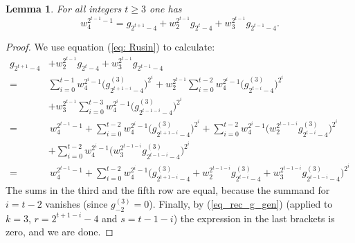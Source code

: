 \documentclass{amsart}
\newtheorem{lemma}[theorem]{Lemma}
\theoremstyle{definition}
\theoremstyle{remark}
\numberwithin{equation}{section}
\renewcommand{\ge}{\geqslant}
\begin{document}
\begin{lemma} \label{lem:rel-2^(t+1)}
For all integers $t\ge3$ one has
    \[w_4^{2^{t-1}-1}=g_{2^{t+1}-4}+w_2^{2^{t-1}}g_{2^t-4} + w_3^{2^{t-1}}g_{2^{t-1}-4}.\]
\end{lemma}
\begin{proof}
    We use equation (\ref{eq: Rusin}) to calculate:
    \begin{align*}
       g_{2^{t+1}-4}&+w_2^{2^{t-1}}g_{2^t-4} + w_3^{2^{t-1}}g_{2^{t-1}-4} \\
       =&\sum_{i= 0}^{t-1}w_4^{2^i-1}\big(g_{2^{t+1-i}-4}^{(3)}\big)^{2^i}+w_2^{2^{t-1}}\!\sum_{i= 0}^{t-2}w_4^{2^i-1}\big(g_{2^{t-i}-4}^{(3)}\big)^{2^i}\\&+w_3^{2^{t-1}}\sum_{i= 0}^{t-3}w_4^{2^i-1}\big(g_{2^{t-1-i}-4}^{(3)}\big)^{2^i} \\
       =&\,w_4^{2^{t-1}-1}+\sum_{i= 0}^{t-2}w_4^{2^i-1}\big(g_{2^{t+1-i}-4}^{(3)}\big)^{2^i}+\sum_{i= 0}^{t-2}w_4^{2^i-1}\big(w_2^{2^{t-1-i}}g_{2^{t-i}-4}^{(3)}\big)^{2^i}\\
       &+\sum_{i= 0}^{t-2}w_4^{2^i-1}\big(w_3^{2^{t-1-i}}g_{2^{t-1-i}-4}^{(3)}\big)^{2^i} \\
       =&\,w_4^{2^{t-1}-1}+\sum_{i= 0}^{t-2}w_4^{2^i-1}\bigg(g_{2^{t+1-i}-4}^{(3)}+w_2^{2^{t-1-i}}g_{2^{t-i}-4}^{(3)}+w_3^{2^{t-1-i}}g_{2^{t-1-i}-4}^{(3)}\bigg)^{2^i}
    \end{align*}
    The sums in the third and the fifth row are equal, because the summand for $i=t-2$ vanishes (since $g_{-2}^{(3)}=0$). Finally, by (\ref{eq_rec_g_gen}) (applied to $k=3$, $r=2^{t+1-i}-4$ and $s=t-1-i$) the expression in the last brackets is zero, and we are done.
\end{proof}
\end{document}
